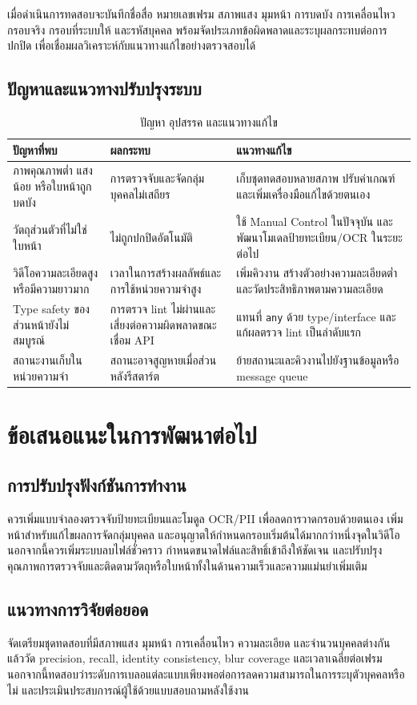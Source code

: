 เมื่อดำเนินการทดสอบจะบันทึกชื่อสื่อ หมายเลขเฟรม สภาพแสง มุมหน้า การบดบัง การเคลื่อนไหว กรอบจริง กรอบที่ระบบให้ และรหัสบุคคล พร้อมจัดประเภทข้อผิดพลาดและระบุผลกระทบต่อการปกปิด เพื่อเชื่อมผลวิเคราะห์กับแนวทางแก้ไขอย่างตรวจสอบได้

\subsection{ปัญหาและแนวทางปรับปรุงระบบ}

\begin{table}[H]
\centering
\caption{ปัญหา อุปสรรค และแนวทางแก้ไข}
\label{tab:problems}
\begin{tabular}{|p{}|p{}|p{}|}
\hline
\textbf{ปัญหาที่พบ} & \textbf{ผลกระทบ} & \textbf{แนวทางแก้ไข} \\
\hline
ภาพคุณภาพต่ำ แสงน้อย หรือใบหน้าถูกบดบัง & การตรวจจับและจัดกลุ่มบุคคลไม่เสถียร & เก็บชุดทดสอบหลายสภาพ ปรับค่าเกณฑ์ และเพิ่มเครื่องมือแก้ไขด้วยตนเอง \\
\hline
วัตถุส่วนตัวที่ไม่ใช่ใบหน้า & ไม่ถูกปกปิดอัตโนมัติ & ใช้ Manual Control ในปัจจุบัน และพัฒนาโมเดลป้ายทะเบียน/OCR ในระยะต่อไป \\
\hline
วิดีโอความละเอียดสูงหรือมีความยาวมาก & เวลาในการสร้างผลลัพธ์และการใช้หน่วยความจำสูง & เพิ่มคิวงาน สร้างตัวอย่างความละเอียดต่ำ และวัดประสิทธิภาพตามความละเอียด \\
\hline
Type safety ของส่วนหน้ายังไม่สมบูรณ์ & การตรวจ lint ไม่ผ่านและเสี่ยงต่อความผิดพลาดขณะเชื่อม API & แทนที่ \texttt{any} ด้วย type/interface และแก้ผลตรวจ lint เป็นลำดับแรก \\
\hline
สถานะงานเก็บในหน่วยความจำ & สถานะอาจสูญหายเมื่อส่วนหลังรีสตาร์ต & ย้ายสถานะและคิวงานไปยังฐานข้อมูลหรือ message queue \\
\hline
\end{tabular}
\end{table}

\section{ข้อเสนอแนะในการพัฒนาต่อไป}

\subsection{การปรับปรุงฟังก์ชันการทำงาน}

ควรเพิ่มแบบจำลองตรวจจับป้ายทะเบียนและโมดูล OCR/PII เพื่อลดการวาดกรอบด้วยตนเอง เพิ่มหน้าสำหรับแก้ไขผลการจัดกลุ่มบุคคล และอนุญาตให้กำหนดกรอบเริ่มต้นได้มากกว่าหนึ่งจุดในวิดีโอ นอกจากนี้ควรเพิ่มระบบลบไฟล์ชั่วคราว กำหนดขนาดไฟล์และสิทธิ์เข้าถึงให้ชัดเจน และปรับปรุงคุณภาพการตรวจจับและติดตามวัตถุหรือใบหน้าทั้งในด้านความเร็วและความแม่นยำเพิ่มเติม

\subsection{แนวทางการวิจัยต่อยอด}

จัดเตรียมชุดทดสอบที่มีสภาพแสง มุมหน้า การเคลื่อนไหว ความละเอียด และจำนวนบุคคลต่างกัน แล้ววัด precision, recall, identity consistency, blur coverage และเวลาเฉลี่ยต่อเฟรม นอกจากนี้ทดสอบว่าระดับการเบลอแต่ละแบบเพียงพอต่อการลดความสามารถในการระบุตัวบุคคลหรือไม่ และประเมินประสบการณ์ผู้ใช้ด้วยแบบสอบถามหลังใช้งาน
